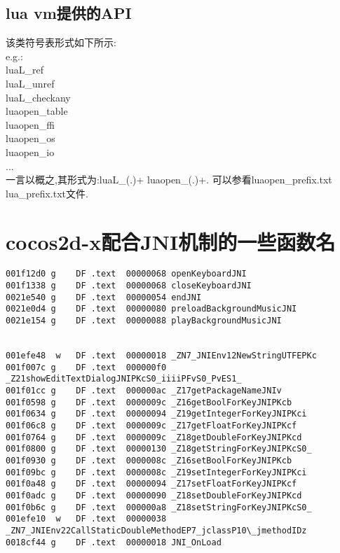 \subsection{lua vm提供的API}
\label{sec:so:lualib}

该类符号表形式如下所示:\\
e.g.:\\
	luaL\_ref\\
	luaL\_unref\\
	luaL\_checkany\\
	luaopen\_table\\
	luaopen\_ffi\\
	luaopen\_os\\
	luaopen\_io\\
	...\\
一言以概之,其形式为:luaL\_(.)+ luaopen\_(.)+.
可以参看luaopen\_prefix.txt  lua\_prefix.txt文件.

\section{cocos2d-x配合JNI机制的一些函数名}

\begin{lstlisting}
001f12d0 g    DF .text  00000068 openKeyboardJNI
001f1338 g    DF .text  00000068 closeKeyboardJNI
0021e540 g    DF .text  00000054 endJNI
0021e0d4 g    DF .text  00000080 preloadBackgroundMusicJNI
0021e154 g    DF .text  00000088 playBackgroundMusicJNI


001efe48  w   DF .text  00000018 _ZN7_JNIEnv12NewStringUTFEPKc
001f007c g    DF .text  000000f0 _Z21showEditTextDialogJNIPKcS0_iiiiPFvS0_PvES1_
001f01cc g    DF .text  000000ac _Z17getPackageNameJNIv
001f0598 g    DF .text  0000009c _Z16getBoolForKeyJNIPKcb
001f0634 g    DF .text  00000094 _Z19getIntegerForKeyJNIPKci
001f06c8 g    DF .text  0000009c _Z17getFloatForKeyJNIPKcf
001f0764 g    DF .text  0000009c _Z18getDoubleForKeyJNIPKcd
001f0800 g    DF .text  00000130 _Z18getStringForKeyJNIPKcS0_
001f0930 g    DF .text  0000008c _Z16setBoolForKeyJNIPKcb
001f09bc g    DF .text  0000008c _Z19setIntegerForKeyJNIPKci
001f0a48 g    DF .text  00000094 _Z17setFloatForKeyJNIPKcf
001f0adc g    DF .text  00000090 _Z18setDoubleForKeyJNIPKcd
001f0b6c g    DF .text  000000a8 _Z18setStringForKeyJNIPKcS0_
001efe10  w   DF .text  00000038 _ZN7_JNIEnv22CallStaticDoubleMethodEP7_jclassP10\_jmethodIDz
0018cf44 g    DF .text  00000018 JNI_OnLoad
\end{lstlisting}


